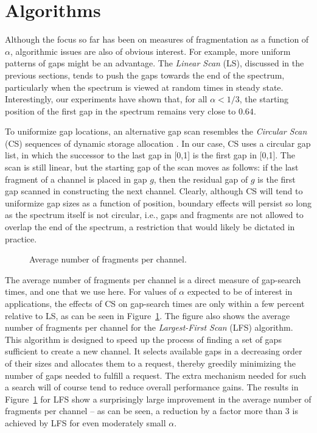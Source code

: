 \documentclass{amsart}
\begin{document}
\section{Algorithms}\label{sec:algorithms}
Although the focus so far has been on measures of fragmentation as a
function of $\alpha$, algorithmic issues are also of obvious
interest.  For example, more uniform patterns of gaps might be an
advantage. The \emph{Linear Scan} (LS), discussed in the previous sections, tends to push
the gaps towards the end of the spectrum, particularly when the
spectrum is viewed at random times in steady state. Interestingly,
our experiments have shown that, for all $\alpha < 1/3$, the
starting position of the first gap in the spectrum remains very
close to $0.64$.

To uniformize gap locations, an alternative
gap scan resembles the {\em Circular Scan} (CS) sequences
of dynamic storage allocation \cite{Knuth1997}. In our case, CS uses
a circular gap list, in which the successor to the last gap in [0,1]
is the first gap in [0,1]. The scan is still linear, but the
starting gap of the scan moves as follows: if the last fragment of
a channel is placed in gap $g$, then the residual gap of $g$ is the
first gap scanned in constructing the next channel. Clearly,
although CS will tend to uniformize gap sizes as a function of
position, boundary effects will persist so long as the spectrum
itself is not circular, i.e., gaps and fragments are not allowed to
overlap the end of the spectrum, a restriction that would likely be
dictated in practice.

\begin{figure}[!t]
\begin{center}
 \caption{Average number of fragments per channel.}
 \label{gapsearch1}
\end{center}
\end{figure}
The average number of fragments per channel is a direct measure of
gap-search times, and one that we use here. For values of $\alpha$
expected to be of interest in applications, the effects of CS on
gap-search times are only within a few percent relative to LS,  as
can be seen in Figure~\ref{gapsearch1}.   The figure also shows the average number of fragments per channel for the \emph{Largest-First Scan} (LFS) algorithm. This algorithm is designed to
speed up the process of finding a set of gaps
sufficient to create a new channel. It selects available gaps in a decreasing order of their sizes and allocates them to a request, thereby greedily minimizing the
number of gaps needed to fulfill a request.
The extra mechanism
needed for such a search will of course tend to reduce overall
performance gains.  The results in Figure~\ref{gapsearch1}
for LFS show  a surprisingly large improvement in the
average number of fragments per channel -- as can be seen, a
reduction by a factor more than 3 is achieved by LFS for even
moderately small $\alpha$.
\end{document}
